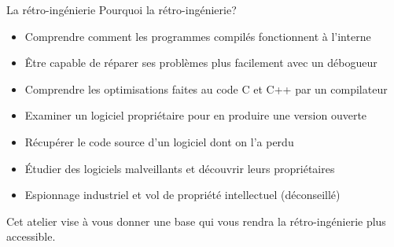 \documentclass[10pt,xcolor={table,dvipsnames},t]{beamer}
\begin{document}
\begin{frame}{La rétro-ingénierie}
    Pourquoi la rétro-ingénierie?
    \begin{itemize}
        \item Comprendre comment les programmes compilés fonctionnent à l'interne
        \item Être capable de réparer ses problèmes plus facilement avec un débogueur
        \item Comprendre les optimisations faites au code C et C++ par un compilateur
        \item Examiner un logiciel propriétaire pour en produire une version ouverte
        \item Récupérer le code source d'un logiciel dont on l'a perdu
        \item Étudier des logiciels malveillants et découvrir leurs propriétaires
        \item Espionnage industriel et vol de propriété intellectuel (déconseillé)
        \newline
    \end{itemize}
    Cet atelier vise à vous donner une base qui vous rendra la rétro-ingénierie plus accessible.
\end{frame}
\end{document}

